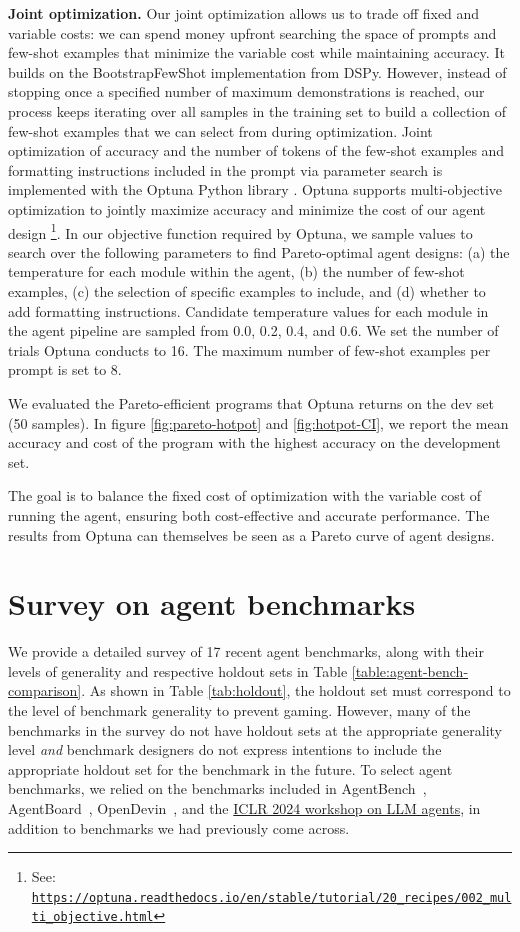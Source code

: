 \documentclass{article}
\begin{document}
\textbf{Joint optimization.} Our joint optimization allows us to trade off fixed and variable costs: we can spend money upfront searching the space of prompts and few-shot examples that minimize the variable cost while maintaining accuracy. It builds on the BootstrapFewShot implementation from DSPy. However, instead of stopping once a specified number of maximum demonstrations is reached, our process keeps iterating over all samples in the training set to build a collection of few-shot examples that we can select from during optimization. Joint optimization of accuracy and the number of tokens of the few-shot examples and formatting instructions included in the prompt via parameter search is implemented with the Optuna Python library \citep{akiba_optuna_2019}. Optuna supports multi-objective optimization to jointly maximize accuracy and minimize the cost of our agent design \footnote{See: \texttt{\url{https://optuna.readthedocs.io/en/stable/tutorial/20_recipes/002_multi_objective.html}}}. In our objective function required by Optuna, we sample values to search over the following parameters to find Pareto-optimal agent designs: (a) the temperature for each module within the agent, (b) the number of few-shot examples, (c) the selection of specific examples to include, and (d) whether to add formatting instructions. Candidate temperature values for each module in the agent pipeline are sampled from 0.0, 0.2, 0.4, and 0.6. We set the number of trials Optuna conducts to 16. The maximum number of few-shot examples per prompt is set to 8.

We evaluated the Pareto-efficient programs that Optuna returns on the dev set (50 samples). In figure \ref{fig:pareto-hotpot} and \ref{fig:hotpot-CI}, we report the mean accuracy and cost of the program with the highest accuracy on the development set. 

The goal is to balance the fixed cost of optimization with the variable cost of running the agent, ensuring both cost-effective and accurate performance. The results from Optuna can themselves be seen as a Pareto curve of agent designs.

\section{Survey on agent benchmarks}
\label{appendix:survey-agent-benchmarks}

We provide a detailed survey of 17 recent agent benchmarks, along with their levels of generality and respective holdout sets in Table \ref{table:agent-bench-comparison}. As shown in Table \ref{tab:holdout}, the holdout set must correspond to the level of benchmark generality to prevent gaming. However, many of the benchmarks in the survey do not have holdout sets at the appropriate generality level \textit{and} benchmark designers do not express intentions to include the appropriate holdout set for the benchmark in the future. 
To select agent benchmarks, we relied on the benchmarks included in AgentBench~\citep{liu_agentbench_2023}, AgentBoard~\citep{ma_agentboard_2024}, OpenDevin~\citep{opendevin_team_opendevin_2024}, and the \href{https://llmagents.github.io/}{ICLR 2024 workshop on LLM agents}, in addition to benchmarks we had previously come across. 
\end{document}
